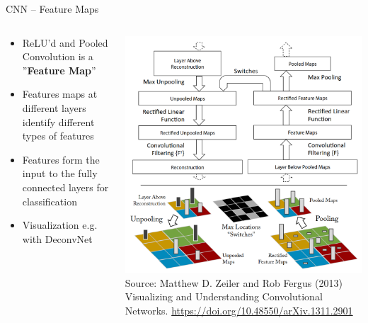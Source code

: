 \documentclass[ignorenonframetext,xcolor=x11names]{beamer}
\begin{document}
\begin{frame}{CNN -- Feature Maps}
\begin{columns}
\begin{column}{0.5\textwidth}
\begin{itemize}
   \item ReLU'd and Pooled Convolution is a ''\textbf{Feature Map}''
   \item Features maps at different layers identify different types of features
   \item Features form the input to the fully connected layers for classification
   \item Visualization e.g. with DeconvNet
\end{itemize}
\end{column}
\begin{column}{0.5\textwidth}
\centering
\includegraphics[width=.95\textwidth]{screen13.png} \\

\vspace{\baselineskip}
\scriptsize Source: Matthew D. Zeiler and Rob Fergus (2013) Visualizing and Understanding Convolutional Networks. \url{https://doi.org/10.48550/arXiv.1311.2901}
\end{column}
\end{columns}
\end{frame}
\end{document}
